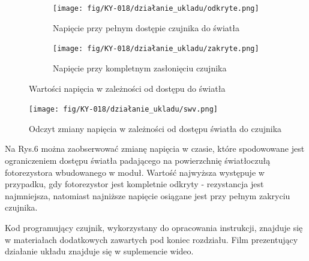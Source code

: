 \documentclass[11pt, a4paper]{article}
\begin{document}
\begin{figure}[h!]
\centering
\begin{subfigure}{.5\textwidth}
  \centering
  \texttt{[image: fig/KY-018/działanie\_ukladu/odkryte.png]}
  \caption{Napięcie przy pełnym dostępie czujnika do światła}
  \label{fig:sub1}
\end{subfigure}%
\begin{subfigure}{.5\textwidth}
  \centering
  \texttt{[image: fig/KY-018/działanie\_ukladu/zakryte.png]}
  \caption{Napięcie przy kompletnym zasłonięciu czujnika}
  \label{fig:sub2}
\end{subfigure}
\caption{Wartości napięcia w zależności od dostępu do światła}
\label{fig:test}
\end{figure}
\newpage

\begin{figure}[h!]
    \centering
    \texttt{[image: fig/KY-018/działanie\_ukladu/swv.png]}
    \caption{Odczyt zmiany napięcia w zależności od dostępu światła do czujnika}
    \label{fig:my_label}
\end{figure}

Na Rys.6 można zaobserwować zmianę napięcia w czasie, które spodowowane jest ograniczeniem dostępu światła padającego na powierzchnię światłoczułą fotorezystora wbudowanego w moduł. Wartość najwyższa występuje w przypadku, gdy fotorezystor jest kompletnie odkryty - rezystancja jest najmniejsza, natomiast najniższe napięcie osiągane jest przy pełnym zakryciu czujnika.
\newline

Kod programujący czujnik, wykorzystany do opracowania instrukcji, znajduje się w materiałach dodatkowych zawartych pod koniec rozdziału.
\newline
Film prezentujący działanie układu znajduje się w suplemencie wideo.
\printbibliography[heading=bibintoc]
\end{document}
